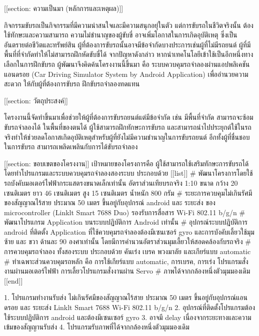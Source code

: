 [[section: ความเป็นมา (หลักการและเหตุผล)]] 

    กิจกรรมขับรถเป็นกิจกรรมที่มีความน่าสนใจและมีความสนุกอยุ่ในตัว แต่การขับรถในชีวิตจริงนั้น ต้องใช้ทักษะและความสามารถ ความไม่ชำนาญของผู้ขับขี่  อาจเพิ่มโอกาสในการเกิดอุบัติเหตุ ซึ่งเป็นอันตรายต่อชีวิตและทรัพย์สิน ผู้ที่ต้องการขับรถนั้นอาจมีข้อจำกัดบางประการเช่นผู้ที่ไม่มีรถยนต์ ผู้ที่มีพื้นที่ที่จำกัดทำให้ไม่สามารถฝึกหัดขับขี่ได้ 
    จากปัญหาดังกล่าว หากนำเทคโนโลยีเข้าใช้เป็นอีกหนึ่งทางเลือกในการฝึกขับรถ ผู้พัฒนาจึงคิดค้นโครงงานนี้ขึ้นมา คือ ระบบควบคุมรถจำลองผ่านแอปพลิเคชันแอนดรอย (Car Driving Simulator System by Android Application) เพื่ออำนวยความสะดวก ให้กับผู้ที่ต้องการขับรถ ฝึกขับรถจำลองทดแทน 


[[section: วัตถุประสงค์]]

    โครงงานนี้จัดทำขึ้นมาเพื่อช่วยให้ผู้ที่ต้องการขับรถยนต์แต่มีข้อจำกัด  เช่น มีพื้นที่จำกัด  สามารถจะซ้อมขับรถจำลองได้ ในพื้นที่ของตนได้ ผู้ใช้สามารถฝึกทักษะการขับรถ และสามารถนำไปประยุกต์ใช้ในรถจริงทำให้ช่วยลดโอกาสเกิดอุบัติเหตุสำหรับผู้ที่ยังไม่มีความชำนาญในการขับรถยนต์  อีกทั้งผู้ที่ชื่นชอบในการขับรถ สามารถเพลิดเพลินกับการได้ขับรถจำลอง

[[section: ขอบเขตของโครงงาน]] 
    เป้าหมายของโครงการคือ ผู้ใช้สามารถใช้เสริมทักษะการขับรถได้ โดยทำโปรแกรมและระบบควบคุมรถจำลองสองระบบ ประกอบด้วย
    [[list]]
        # พัฒนาโครงการโดยใช้รถบังคับมอเตอร์ไฟฟ้ากระแสตรงขนาดเล็กเท่านั้น อัตราส่วนเทียบรถจริง 1:10  ขนาด กว้าง 20 เซนติเมตร  ยาว 46 เซนติเมตร สูง 15 เซนติเมตร น้ำหนัก 800 กรัม
        # ระยะการควบคุมไม่เกินรัศมีของสัญญาณไร้สาย ประมาณ 50 เมตร ขึ้นอยู่กับอุปกรณ์ android และ ระยะส่ง ของ microcontroller (Linklt Smart 7688 Duo) รองรับการสื่อสาร Wi-Fi 802.11 b/g/n
        # พัฒนาโปรแกรม Application บนระบบปฏิบัติการ Android  เท่านั้น
        # อุปกรณ์ระบบปฎิบัติการ android ที่ติดตั้ง Application ที่ใช้ควบคุมรถจำลองต้องมีเซนเซอร์ gyro และการบังคับเลี้ยวใช้มุม ซ้าย และ ขวา ด้านละ 90 องศาเท่านั้น โดยมีการคำนวนอัตราส่วนมุมเลี้ยวให้สอดคล้องกับรถจริง
        # การควบคุมรถจำลอง ทั้งสองระบบ ประกอบด้วย คันเร่ง เบรค พวงมาลัย และเกียร์แบบ automatic
        # ทำเฉพาะส่วนควบคุมรถหลัก คือ การใช้เกียร์แบบ automatic, การเบรค, การเร่ง โปรแกรมสั่งงานผ่านมอเตอร์ไฟฟ้า  การเลี้ยวโปรแกรมสั่งงานผ่าน Servo
        # ภาพได้จากกล้องหนึ่งตัวมุมมองเดิม
    [[end]]

    1. โปรแกรมทำงานรับส่ง ไม่เกินรัศมีของสัญญาณไร้สาย ประมาณ 50 เมตร ขึ้นอยู่กับอุปกรณ์แอนดรอย และ ระยะส่ง Linklt Smart 7688 Wi-Fi 802.11 b/g/n
    2. อุปกรณ์ที่ติดตั้งโปรแกรมต้องใช้ระบบปฎิบัติการ android และต้องมีเซนเซอร์ gyro 
    3. อาจมี delay เนื่องจากระยะทางและความเข้มของสัญญานรับส่ง
    4. โปรแกรมรับภาพที่ได้จากกล้องหนึ่งตัวมุมมองเดิม

